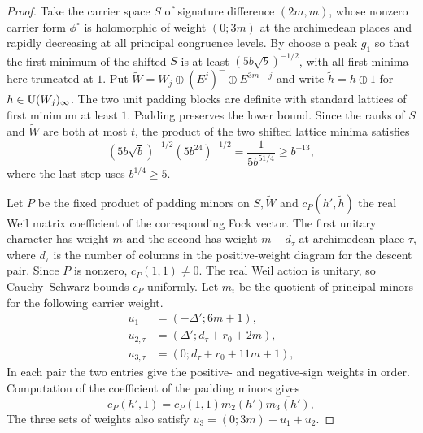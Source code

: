 \begin{proof}
Take the carrier space $S$ of signature difference $(2m,m)$, whose nonzero carrier form $\phi^\circ$ is holomorphic of weight $(0;3m)$ at the archimedean places and rapidly decreasing at all principal congruence levels. By  choose a peak $g_1$ so that the first minimum of the shifted $S$ is at least $(5b\sqrt b)^{-1/2}$, with all first minima here truncated at $1$. Put $\widetilde W=W_j\oplus(E^j)^-\oplus E^{3m-j}$ and write $\widetilde h=h\oplus1$ for $h\in \operatorname{U}(W_j)_\infty$. The two unit padding blocks are definite with standard lattices of first minimum at least $1$. Padding preserves the lower bound. Since the ranks of $S$ and $\widetilde W$ are both at most $t$, the product of the two shifted lattice minima satisfies
\[
 (5b\sqrt b)^{-1/2}(5b^{24})^{-1/2}
 =\frac{1}{5b^{51/4}}\ge b^{-13},
\]
where the last step uses $b^{1/4}\ge5$.

Let $P$ be the fixed product of padding minors on $S,\widetilde W$ and $c_P(h',\widetilde h)$ the real Weil matrix coefficient of the corresponding Fock vector. The first unitary character has weight $m$ and the second has weight $m-d_\tau$ at archimedean place $\tau$, where $d_\tau$ is the number of columns in the positive-weight diagram for the descent pair. Since $P$ is nonzero, $c_P(1,1)\ne0$. The real Weil action is unitary, so Cauchy--Schwarz bounds $c_P$ uniformly. Let $m_i$ be the quotient of principal minors for the following carrier weight.
\[
 \begin{aligned}
 u_1&=(-\Delta';6m+1), \\
 u_{2,\tau}&=(\Delta';d_\tau+r_0+2m), \\
 u_{3,\tau}&=(0;d_\tau+r_0+11m+1),
 \end{aligned}
\]
In each pair the two entries give the positive- and negative-sign weights in order. Computation of the coefficient of the padding minors gives
\[
 c_P(h',1)=c_P(1,1)m_2(h')\overline{m_3(h')},
\]
The three sets of weights also satisfy $u_3=(0;3m)+u_1+u_2$.


\end{proof}
